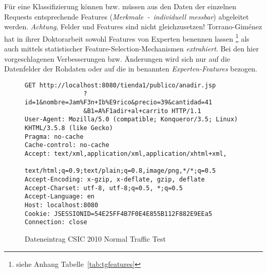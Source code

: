 Für eine Klassifizierung können bzw. müssen aus den Daten der einzelnen Requests entsprechende Features (\emph{Merkmale~-~individuell messbar}) abgeleitet werden. \emph{Achtung}, Felder und Features sind nicht gleichzusetzen! Torrano-Giménez hat in ihrer Doktorarbeit sowohl Features von Experten benennen lassen \footnote{siehe Anhang Tabelle~\ref{tab:tgfeatures}} als auch mittels statistischer Feature-Selection-Mechanismen \emph{extrahiert}. Bei den hier vorgeschlagenen Verbesserungen bzw. Änderungen wird sich nur auf die Datenfelder der Rohdaten oder auf die in \cite{Giménez2015} benannten \emph{Experten-Features} bezogen. 


\begin{figure}[h]
  \centering
        \begin{lstlisting}[basicstyle=\footnotesize]
GET http://localhost:8080/tienda1/publico/anadir.jsp
                ?id=1&nombre=Jam%F3n+Ib%E9rico&precio=39&cantidad=41
                &B1=A%F1adir+al+carrito HTTP/1.1
User-Agent: Mozilla/5.0 (compatible; Konqueror/3.5; Linux) KHTML/3.5.8 (like Gecko)
Pragma: no-cache
Cache-control: no-cache
Accept: text/xml,application/xml,application/xhtml+xml,
                text/html;q=0.9;text/plain;q=0.8,image/png,*/*;q=0.5
Accept-Encoding: x-gzip, x-deflate, gzip, deflate
Accept-Charset: utf-8, utf-8;q=0.5, *;q=0.5
Accept-Language: en
Host: localhost:8080
Cookie: JSESSIONID=54E25FF4B7F0E4E855B112F882E9EEa5
Connection: close
\end{lstlisting}
\caption{Dateneintrag CSIC 2010 Normal Traffic Test}
\label{fig:ccex}
\end{figure}

